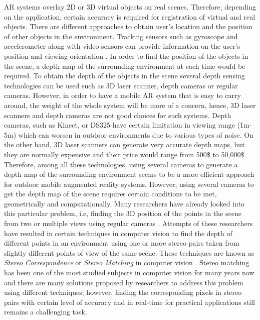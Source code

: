 \documentclass[dvips,letterpaper,12pt]{report}
\begin{document}
AR systems overlay 2D or 3D virtual objects on real scenes. Therefore, depending on the application, certain accuracy is required for 
registration of virtual and real objects. There are different approaches to obtain user's location and the position of other objects in the environment.
Tracking sensors such as gyroscope and accelerometer along with video sensors can provide information on the user's position and viewing orientation \cite{azum01}.
In order to find the position of the objects in the scene, a depth map of the surrounding environment at each time would be required. To obtain the depth of the 
objects in the scene several depth sensing technologies can be used such as 3D laser scanner, depth cameras or regular cameras. However, in order to have a mobile AR
system that is easy to carry around, the weight of the whole system will be more of a concern, hence, 3D laser scanners and depth cameras are not good choices for such systems.
Depth cameras, such as Kinect, or DS325 have certain limitation in viewing range (1m-5m) which can worsen in outdoor environments due to various types of noise. 
On the other hand, 3D laser scanners can
generate very accurate depth maps, but they are normally expensive and their price would range from 500\$ to 50,000\$. Therefore, among all these technologies, using several 
cameras to generate a depth map of the surrounding environment seems to be a more efficient approach for outdoor mobile augmented reality systems. {\newline}
However, using several cameras to get the depth map of the scene requires certain conditions to be met, geometrically and computationally. Many researchers have already looked into
this particular problem, i.e, finding the 3D position of the points in the scene from two or multiple views using regular cameras \cite{sze11}. Attempts of these researchers have resulted in
certain techniques in computer vision to find the depth of different points in an environment using one or more stereo pairs taken from slightly different points of view of the same scene.
These techniques are known as {\it Stereo Correspondence} or {\it Stereo Matching} in computer vision \cite{sze11}. Stereo matching has been one of the most studied subjects in computer vision for 
many years now and there are many solutions proposed by researchers to address this problem using different techniques; however, finding the corresponding pixels in stereo pairs with certain level of 
accuracy and in real-time for practical applications still remains a challenging task. {\newline}
\end{document}
